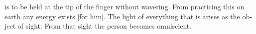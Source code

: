 \begin{otherlanguage}{english}
\begin{tlate}
is to be held at the tip of the finger without wavering. From practicing this on earth any energy exists [for him]. The light of everything that is arises as the object of sight. From that sight the person becomes omniscient. 
\end{tlate}
\end{otherlanguage}